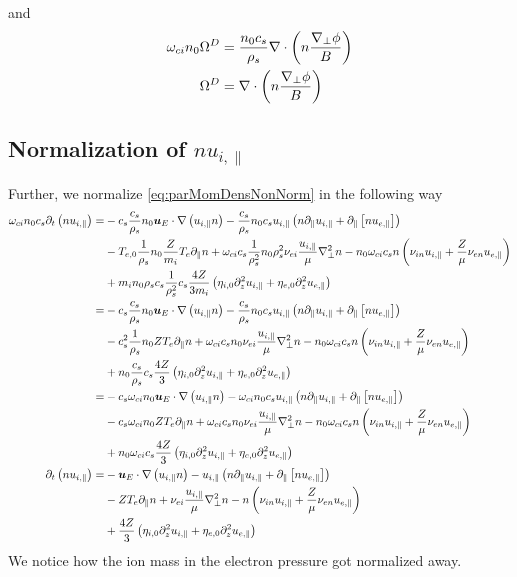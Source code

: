 %
and
%
\begin{align*}
    \omega_{ci}n_0\Omega^D &= \frac{n_0 c_s}{\rho_s}\nabla\cdot\left(n\frac{\nabla_\perp\phi}{B}\right)\\
    \Omega^D &= \nabla\cdot\left(n\frac{\nabla_\perp\phi}{B}\right)
\end{align*}
%

\subsection{Normalization of \texorpdfstring{$nu_{i,\|}$}{the parallel momentum density}}
%
Further, we normalize \cref{eq:parMomDensNonNorm} in the following way
%
\begin{align*}
    \omega_{ci}n_0c_s \partial_t\left( n u_{i,\|}\right)
 =&
 - c_s\frac{c_s}{\rho_s}n_0
  \boldsymbol{u}_E \cdot \nabla\left( u_{i,\|} n \right)
 - \frac{c_s}{\rho_s}n_0c_s
    u_{i, \|}
    \left(
    n \partial_\| u_{i,\|}
    + \partial_\|\left[n u_{e,\|} \right]
    \right)   \\&
    - T_{e,0}\frac{1}{\rho_s}n_0
 \frac{Z}{m_i} T_e \partial_\| n
 + \omega_{ci}c_s\frac{1}{\rho_s^2}n_0\rho_s^2
 \nu_{ei} \frac{u_{i,\|}}{\mu} \nabla_\perp^2 n
 - n_0\omega_{ci}c_s
 n \left(\nu_{i n}u_{i,\|} + \frac{Z}{\mu} \nu_{e n}u_{e,\|}\right)
   \\&
   + m_in_0\rho_sc_s\frac{1}{\rho_s^2}c_s \frac{4Z}{3m_i}\left(
   \eta_{i,0} \partial_z^2 u_{i,\|}
 + \eta_{e,0}\partial_z^2 u_{e,\|}
 \right)
 \\
 =&
 - c_s\frac{c_s}{\rho_s}n_0
  \boldsymbol{u}_E \cdot \nabla\left( u_{i,\|} n \right)
 - \frac{c_s}{\rho_s}n_0c_s
  u_{i, \|}
    \left(
    n \partial_\| u_{i,\|}
    + \partial_\|\left[n u_{e,\|} \right]
    \right)
   \\&
 - c_s^2\frac{1}{\rho_s}n_0
 ZT_e \partial_\| n
 + \omega_{ci}c_sn_0
 \nu_{ei} \frac{u_{i,\|}}{\mu} \nabla_\perp^2 n
 - n_0\omega_{ci}c_s
 n \left(\nu_{i n}u_{i,\|} + \frac{Z}{\mu} \nu_{e n}u_{e,\|}\right)
   \\&
   + n_0\frac{c_s}{\rho_s}c_s\frac{4Z}{3}\left(
   \eta_{i,0} \partial_z^2 u_{i,\|}
 + \eta_{e,0}\partial_z^2 u_{e,\|}
 \right)
 \\
 =&
 - c_s\omega_{ci}n_0
  \boldsymbol{u}_E \cdot \nabla\left( u_{i,\|} n \right)
 - \omega_{ci}n_0c_s
  u_{i, \|}
    \left(
    n \partial_\| u_{i,\|}
    + \partial_\|\left[n u_{e,\|} \right]
    \right)
    \\&
 - c_s\omega_{ci}n_0Z
 T_e \partial_\| n
 + \omega_{ci}c_sn_0
 \nu_{ei} \frac{u_{i,\|}}{\mu} \nabla_\perp^2 n
 - n_0\omega_{ci}c_s
 n \left(\nu_{i n}u_{i,\|} + \frac{Z}{\mu} \nu_{e n}u_{e,\|}\right)
   \\&
   + n_0\omega_{ci}c_s\frac{4Z}{3}\left(\eta_{i,0} \partial_z^2 u_{i,\|}
 + \eta_{e,0}\partial_z^2 u_{e,\|}\right)
 \\
  \partial_t\left( n u_{i,\|}\right)
 =&
 -  \boldsymbol{u}_E \cdot \nabla\left( u_{i,\|} n \right)
 - u_{i, \|}
    \left(
    n \partial_\| u_{i,\|}
    + \partial_\|\left[n u_{e,\|} \right]
    \right)
   \\&
 - ZT_e \partial_\| n
 + \nu_{ei} \frac{u_{i,\|}}{\mu} \nabla_\perp^2 n
 - n \left(\nu_{i n}u_{i,\|} + \frac{Z}{\mu} \nu_{e n}u_{e,\|}\right)
   \\&
   + \frac{4Z}{3}\left(\eta_{i,0} \partial_z^2 u_{i,\|}
 + \eta_{e,0}\partial_z^2 u_{e,\|}\right)
\end{align*}
%
We notice how the ion mass in the electron pressure got normalized away.

